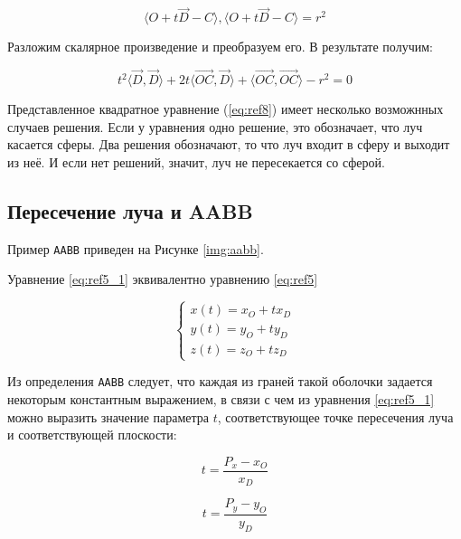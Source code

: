 \begin{equation}
	\langle O + t\overrightarrow{D} - C \rangle, \langle O + t\overrightarrow{D} - C\rangle = r^2
\end{equation}

Разложим скалярное произведение и преобразуем его. В результате получим:

\begin{equation}
	t^2 \langle \overrightarrow{D}, \overrightarrow{D} \rangle + 2t \langle \overrightarrow{OC}, \overrightarrow{D} \rangle + \langle \overrightarrow{OC}, \overrightarrow{OC} \rangle -r^2 = 0
	\label{eq:ref8}
\end{equation}

Представленное квадратное уравнение (\ref{eq:ref8}) имеет несколько возможнных случаев решения.
Если у уравнения одно решение, это обозначает, что луч касается сферы.
Два решения обозначают, то что луч входит в сферу и выходит из неё.
И если нет решений, значит, луч не пересекается со сферой.

\subsection{Пересечение луча и AABB}

Пример \texttt{AABB} приведен на Рисунке \ref{img:aabb}.


Уравнение \eqref{eq:ref5_1} эквивалентно уравнению \eqref{eq:ref5}

\begin{equation}
	{\begin{cases}
			x(t) = x_O + t x_D \\
			y(t) = y_O + t y_D \\
			z(t) = z_O + t z_D
			\label{eq:ref5_1}
		\end{cases}}
\end{equation}

Из определения \texttt{AABB} следует, что каждая из граней такой оболочки задается некоторым константным выражением, в связи с чем из уравнения \eqref{eq:ref5_1} можно выразить значение параметра $t$, соответствующее точке пересечения луча и соответствующей плоскости:

\begin{equation}
	t = \frac{P_x - x_O}{x_D}
	\label{eq:t_aabb_1}
\end{equation}

\begin{equation}
    t = \frac{P_y - y_O}{y_D}
    \label{eq:t_aabb_2}
\end{equation}

